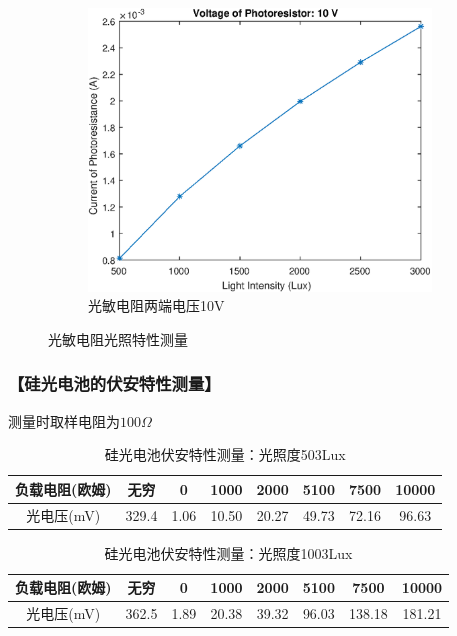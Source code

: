 \documentclass{ctexart}
\let\oldsubsubsection\subsubsection
\renewcommand{\subsubsection}[1]{\oldsubsubsection{\!\!\!\!\!\!【#1】}}
\begin{document}
\begin{figure}[H]
\begin{subfigure}{.45\textwidth}
    \centering
    \includegraphics[width=\linewidth]{光电传感器综合实验图像/photoresistor_10V}
  \caption{光敏电阻两端电压10V}
  \end{subfigure}
  \caption{光敏电阻光照特性测量}
\end{figure}

\newpage
\subsubsection{硅光电池的伏安特性测量}

测量时取样电阻为$100\Omega$

\begin{table}[H]
  \centering
  \begin{tabular}{|c|c|c|c|c|c|c|c|}
    \hline
    负载电阻(欧姆) &无穷&0&1000&2000&5100&7500&10000\\\hline
    光电压(mV) &329.4&1.06&10.50&20.27&49.73&72.16&96.63\\\hline
  \end{tabular}
  \caption{硅光电池伏安特性测量：光照度503Lux}
\end{table}

\begin{table}[H]
  \centering
  \begin{tabular}{|c|c|c|c|c|c|c|c|}
    \hline
    负载电阻(欧姆) &无穷&0&1000&2000&5100&7500&10000\\\hline
    光电压(mV) &362.5&1.89&20.38&39.32&96.03&138.18&181.21\\\hline
  \end{tabular}
  \caption{硅光电池伏安特性测量：光照度1003Lux}
\end{table}
\end{document}
